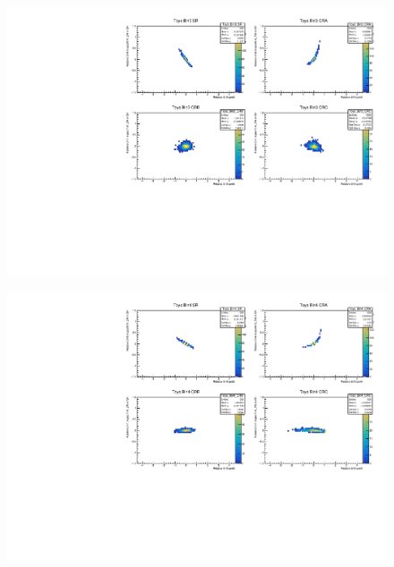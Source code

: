 \begin{figure}[H]
\includegraphics[width=\textwidth]{plots/diffx/instab/constfx/instabilities_mjj_QCD_Mgraph_Signal_Sh2211_BSMCQCDSTATS_sherpaasimov_bin3.pdf}
\end{figure}
\begin{figure}[H]
\includegraphics[width=\textwidth]{plots/diffx/instab/constfx/instabilities_mjj_QCD_Mgraph_Signal_Sh2211_BSMCQCDSTATS_sherpaasimov_bin4.pdf}
\end{figure}

